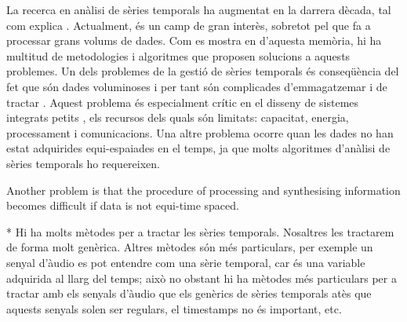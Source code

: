 La recerca en anàlisi de sèries temporals ha augmentat en la darrera
dècada, tal com explica \textcite{fu11}. Actualment, és un camp de
gran interès, sobretot pel que fa a processar grans volums de dades.
Com es mostra en  d'aquesta memòria, hi ha multitud
de metodologies i algoritmes que proposen solucions a aquests
problemes. Un dels problemes de la gestió de sèries temporals és
conseqüència del fet que són dades voluminoses i per tant són
complicades d'emmagatzemar i de tractar \cite{fu11,keogh08:isax}.
Aquest problema és especialment crític en el disseny de sistemes
integrats petits \cite{yaogehrke02}, els recursos dels quals són
limitats: capacitat, energia, processament i comunicacions.  Una altre
problema ocorre quan les dades no han estat adquirides equi-espaiades
en el temps, ja que molts algoritmes d'anàlisi de sèries temporals ho
requereixen.

  Another problem is that the procedure of
processing and synthesising information becomes difficult if data is
not equi-time spaced.




* Hi ha molts mètodes per a tractar les sèries temporals. Nosaltres les tractarem de forma molt genèrica. Altres mètodes són més particulars, per exemple un senyal d'àudio es pot entendre com una sèrie temporal, car és una variable adquirida al llarg del temps; això no obstant hi ha mètodes més particulars per a tractar amb els senyals d'àudio que els genèrics de sèries temporals atès que aquests senyals solen ser regulars, el timestamps no és important, etc.

